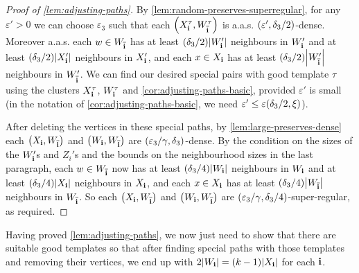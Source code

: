 \documentclass[11pt,english]{article}
\theoremstyle{plain}
\theoremstyle{plain}
\theoremstyle{plain}
\theoremstyle{plain}
\theoremstyle{plain}
\theoremstyle{definition}
\theoremstyle{definition}
\theoremstyle{remark}
\theoremstyle{remark}
\theoremstyle{plain}
\theoremstyle{definition}
\theoremstyle{definition}
\theoremstyle{plain}
\theoremstyle{plain}
\theoremstyle{plain}
\theoremstyle{plain}
\theoremstyle{remark}
\theoremstyle{plain}
\theoremstyle{definition}
\let\originalleft\left
\let\originalright\right
\renewcommand{\left}{\mathopen{}\mathclose\bgroup\originalleft}
\renewcommand{\right}{\aftergroup\egroup\originalright}
\begin{document}
\begin{proof}[Proof of \ref{lem:adjusting-paths}]
By \ref{lem:random-preserves-superregular}, for any $\varepsilon'>0$
we can choose $\varepsilon_{3}$ such that each $\left(X_{\bi}^{\tau},W_{\flip{\bi}}^{\tau}\right)$
is a.a.s. $\left(\varepsilon',\delta_{3}/2\right)$-dense. Moreover
a.a.s. each $w\in W_{\overline{\mathbf{i}}}$ has at least $\left(\delta_{3}/2\right)\left|W_{\bi}'\right|$
neighbours in $W_{\mathbf{i}}'$ and at least $\left(\delta_{3}/2\right)\left|X_{\bi}'\right|$
neighbours in $X_{\mathbf{i}}'$, and each $x\in X_{\mathbf{i}}$ has at least $\left(\delta_{3}/2\right)\left|W_{\flip{\bi}}'\right|$
neighbours in $W_{\overline{\mathbf{i}}}'$. We can find our desired special
pairs with good template $\tau$ using the clusters $X_{\mathbf{i}}^{\tau}$,
$W_{\mathbf{i}}^{\tau}$ and \ref{cor:adjusting-paths-basic}, provided $\varepsilon'$
is small (in the notation of \ref{cor:adjusting-paths-basic}, we
need $\varepsilon'\le\varepsilon\left(\delta_{3}/2,\xi\right)$).

After deleting the vertices in these special paths, by \ref{lem:large-preserves-dense}
each $\left(X_{\bi},W_{\flip{\bi}}\right)$ and $\left(W_{\bi},W_{\flip{\bi}}\right)$
are $\left(\varepsilon_{3}/\gamma,\delta_{3}\right)$-dense. By the
condition on the sizes of the $W_{\mathbf{i}}'$s and $Z_{i}'$s and the
bounds on the neighbourhood sizes in the last paragraph, each $w\in W_{\overline{\mathbf{i}}}$
now has at least $\left(\delta_{3}/4\right)\left|W_{\bi}\right|$
neighbours in $W_{\mathbf{i}}$ and at least $\left(\delta_{3}/4\right)\left|X_{\bi}\right|$
neighbours in $X_{\mathbf{i}}$, and each $x\in X_{\mathbf{i}}$ has at least $\left(\delta_{3}/4\right)\left|W_{\flip{\bi}}\right|$
neighbours in $W_{\overline{\mathbf{i}}}$. So each $\left(X_{\bi},W_{\flip{\bi}}\right)$
and $\left(W_{\bi},W_{\flip{\bi}}\right)$ are $\left(\varepsilon_{3}/\gamma,\delta_{3}/4\right)$-super-regular,
as required.
\end{proof}
Having proved \ref{lem:adjusting-paths}, we now just need to show
that there are suitable good templates so that after finding special
paths with those templates and removing their vertices, we end up
with $2\left|W_{\bi}\right|=\left(k-1\right)\left|X_{\bi}\right|$
for each $\mathbf{i}$.
\end{document}
